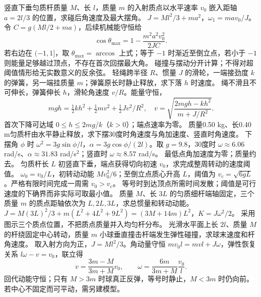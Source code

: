 \problemtext 竖直下垂匀质杆质量 $M$、长 $l$，质量 $m$ 的入射质点以水平速率 $v_0$ 嵌入距轴 $a=2l/3$ 的位置，求碰后角速度及最大摆角。
\workings $J=Ml^2/3+ma^2$，$\omega_1=mav_0/J$。令 $C=g(Ml/2+ma)$，后续机械能守恒给
\[
\cos\theta_{\max}=1-\frac{m^2a^2v_0^2}{2JC}.
\]
若右边在 $(-1,1]$，取 $\theta_{\max}=\arccos$ 上式；等于 $-1$ 时渐近至倒立点，若小于 $-1$ 则能量足够越过顶点，不存在首次回摆最大角。
\crosscheck 碰撞与摆动分开计算；不得对超阈值情形给无实数意义的反余弦。
\problemtext 轻绳跨半径 $R$、惯量 $J$ 的滑轮，一端接劲度 $k$ 的弹簧，另一端挂质量 $m$；弹簧原长时静止释放，求下落 $h$ 时速度。
\workings 绳不滑且不可伸长，弹簧伸长 $h$，滑轮角速度 $v/R$。能量守恒，
\[
mgh=\tfrac12kh^2+\tfrac12mv^2+\tfrac12Jv^2/R^2,\quad
v=\sqrt{\frac{2mgh-kh^2}{m+J/R^2}}.
\]
\crosscheck 首次下降可达域 $0\le h\le2mg/k$（$k>0$）；端点速率为零。
\problemtext 质量0.50 kg、长0.40 m匀质杆由水平静止释放，求下摆30度时角速度与角加速度、竖直时角速度。
\workings 下摆角 $\phi$ 时 $\omega^2=3g\sin\phi/l$，$\alpha=3g\cos\phi/(2l)$。取 $g=9.8$，30度时 $\omega\approx6.06$ rad/s、$\alpha\approx31.83$ rad/s$^2$；竖直时 $\omega\approx8.57$ rad/s。
\crosscheck 最低点角加速度为零；质量约去。
\problemtext 匀质杆长 $L$ 初竖直下垂，端点获得切向初速 $v_0$，求完成整周转动的速度阈值。
\workings $\omega_0=v_0/L$，初转动动能 $Mv_0^2/6$；至倒立点质心升高 $L$，阈值为 $v_c=\sqrt{6gL}$。严格有限时间完成一周需 $v_0>v_c$。
\crosscheck 等号时到达顶点所需时间发散；阈值是可行速度的下确界而非实际可取最小值。
\problemtext 质量 $M$、长 $3L$ 的匀质细杆端轴固定，三个质量 $m$ 的质点距轴依次为 $L,2L,3L$，求总惯量和转动动能。
\workings $J=M(3L)^2/3+m(L^2+4L^2+9L^2)=(3M+14m)L^2$，$K=J\omega^2/2$。
\crosscheck 采用图示三个质点位置，不把质点质量并入均匀杆分布。
\problemtext 光滑水平面上长 $2l$、质量 $M$ 的杆绕固定中心转动，质量 $m$ 小球垂直撞击杆端发生弹性碰撞，求球末速度和杆角速度。
\workings 取入射方向为正，$J=Ml^2/3$。角动量守恒 $mv_0l=mvl+J\omega$，弹性恢复关系 $l\omega-v=v_0$，联立得
\[
v=\frac{3m-M}{3m+M}v_0,\qquad
\omega=\frac{6m}{3m+M}\frac{v_0}{l}.
\]
\crosscheck 回代动能守恒；只有 $M>3m$ 时球真正反弹，等号时静止，$M<3m$ 时仍向前。若中心不固定而可平动，需另建模型。

